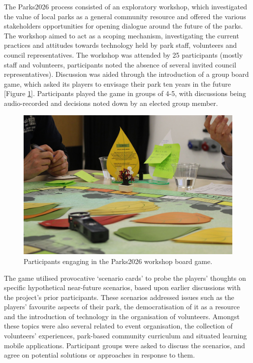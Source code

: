 The Parks2026 process consisted of an exploratory workshop, which investigated the value of local parks as a general community resource and offered the various stakeholders opportunities for opening dialogue around the future of the parks. The workshop aimed to act as a scoping mechanism, investigating the current practices and attitudes towards technology held by park staff, volunteers and council representatives. The workshop was attended by 25 participants (mostly staff and volunteers, participants noted the absence of several invited council representatives). Discussion was aided through the introduction of a group board game, which asked its players to envisage their park ten years in the future [Figure \ref{fig:parks2026}]. Participants played the game in groups of 4-5, with discussions being audio-recorded and decisions noted down by an elected group member.

\begin{figure}
  \centering
  \includegraphics[width=0.8\columnwidth]{images/chapter04/parks2026.jpg}
  \caption{Participants engaging in the Parks2026 workshop board game.}
  \label{fig:parks2026}
\end{figure}

The game utilised provocative `scenario cards' to probe the players’ thoughts on specific hypothetical near-future scenarios, based upon earlier discussions with the project's prior participants. These scenarios addressed issues such as the players’ favourite aspects of their park, the democratisation of it as a resource and the introduction of technology in the organisation of volunteers. Amongst these topics were also several related to event organisation, the collection of volunteers’ experiences, park-based community curriculum and situated learning mobile applications. Participant groups were asked to discuss the scenarios, and agree on potential solutions or approaches in response to them.

